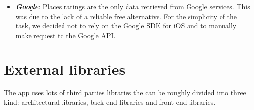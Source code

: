 \documentclass[a4paper, 11pt, parskip=half]{scrreprt}
\theoremstyle{definition}
\begin{document}
\begin{itemize}
		\begin{lstlisting}[language=sql, caption={SPARQL query for city detail retrieving}, captionpos=b]
			SELECT DISTINCT ?city ?cityLabel ?country ?countryLabel ?population ?area ?elevation ?link ?facebookPageId ?facebookPlacesId ?instagramUsername ?twitterUsername ?image ?coatOfArmsImage ?cityFlagImage ?countryCode ?wikipediaLink WHERE {
            BIND( <http://www.wikidata.org/entity/\(cityId)> as ?city ).
            OPTIONAL {?city wdt:P17 ?country}.
            OPTIONAL {?city wdt:P1082 ?population}.
            OPTIONAL {?city wdt:P2046 ?area}.
            OPTIONAL {?city wdt:P2044 ?elevation}.
            OPTIONAL {?city wdt:P856 ?link}.
            OPTIONAL {?city wdt:P2013 ?facebookPageId}.
            OPTIONAL {?city wdt:P1997 ?facebookPlacesId}.
            OPTIONAL {?city wdt:P2003 ?instagramUsername}.
            OPTIONAL {?city wdt:P2002 ?twitterUsername}.
            OPTIONAL {?city wdt:P18 ?image}.
            OPTIONAL {?city wdt:P94  ?coatOfArmsImage}.
            OPTIONAL {?city wdt:P41 ?cityFlagImage}.
            OPTIONAL {?country wdt:P297 ?countryCode}.
            OPTIONAL {?wikipediaLink schema:about ?city;
              schema:inLanguage "en";
              schema:isPartOf [ wikibase:wikiGroup "wikipedia" ]}.
            SERVICE wikibase:label { bd:serviceParam wikibase:language "en". }
        }
		\end{lstlisting}
		
	\item \textit{\textbf{Google}}: Places ratings are the only data retrieved from Google services. This was due to the lack of a reliable free alternative. For the simplicity of the task, we decided not to rely on the Google SDK for iOS and to manually make request to the Google API.
\end{itemize}

\section{External libraries}

The app uses lots of third parties libraries the can be roughly divided into three kind: architectural libraries, back-end libraries and front-end libraries.
\end{document}
